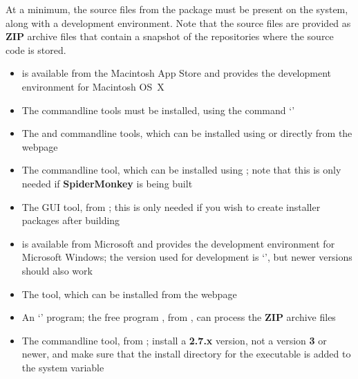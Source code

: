At a minimum, the source files from the  package must be present on the
system, along with a  development environment.
Note that the source files are provided as \textbf{ZIP} archive files that contain a
snapshot of the  repositories where the source code is stored.
\tertiaryEnd
{}
\begin{itemize}
\item{} is available from the Macintosh App Store and provides the
 development environment for Macintosh OS~X
\item\exSp{}The  command\longDash{}line tools must be installed, using the
command `'
\item\exSp{}The  and  command\longDash{}line tools, which
can be installed using  or directly from the web\longDash{}page
\item\exSp{}The  command\longDash{}line tool, which can be installed
using ; note that this is only needed if \textbf{SpiderMonkey} is being
built
\item\exSp{}The  GUI tool, from
;
this is only needed if you wish to create installer packages after building \mplusm
\end{itemize}
\tertiaryEnd
{}
\begin{itemize}
\item{} is available from Microsoft and provides the 
development environment for Microsoft Windows; the version used for development is
`', but newer versions should also work
\item\exSp{}The  tool, which can be installed from the web\longDash{}page
\item\exSp{}An `' program; the free program , from
, can process the \textbf{ZIP} archive files
\item\exSp{}The  command\longDash{}line tool, from
; install a \textbf{2.7.x}
version, not a version \textbf{3} or newer, and make sure that the install directory for
the executable is added to the system  variable
\end{itemize}
